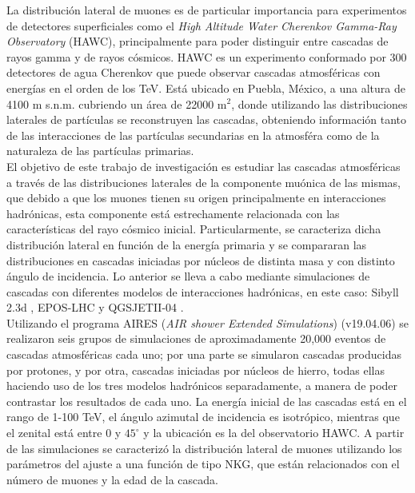 La distribuci\'on lateral de muones es de particular importancia para experimentos de detectores superficiales como el \textit{High Altitude Water Cherenkov Gamma-Ray Observatory} (HAWC), principalmente para poder distinguir entre cascadas de rayos gamma y de rayos c\'osmicos. HAWC es un experimento conformado por 300 detectores de agua Cherenkov que puede observar cascadas atmosf\'ericas con energ\'ias en el orden de los TeV. Est\'a ubicado en Puebla, M\'exico, a una altura de 4100 m s.n.m. cubriendo un \'area de 22000 m$^2$, donde utilizando las distribuciones laterales de part\'iculas se reconstruyen las cascadas, obteniendo informaci\'on tanto de las interacciones de las part\'iculas secundarias en la atmosf\'era como de la naturaleza de las part\'iculas primarias.\\

El objetivo de este trabajo de investigaci\'on es estudiar las cascadas atmosf\'ericas a trav\'es de las distribuciones laterales de la componente mu\'onica de las mismas, que debido a que los muones tienen su origen principalmente en interacciones hadr\'onicas, esta componente est\'a estrechamente relacionada con las caracter\'isticas del rayo c\'osmico inicial. Particularmente, se caracteriza dicha distribuci\'on lateral en funci\'on de la energ\'ia primaria y se compararan las distribuciones en cascadas iniciadas por n\'ucleos de distinta masa y con distinto \'angulo de incidencia. Lo anterior se lleva a cabo mediante simulaciones de cascadas con diferentes modelos de interacciones hadrónicas, en este caso: Sibyll 2.3d \cite{Riehn2020}, EPOS-LHC \cite{Pierog2015} y QGSJETII-04 \cite{Ostapchenko2011}.\\

Utilizando el programa AIRES (\textit{AIR shower Extended Simulations}) (v19.04.06) \cite{Sciutto2021} se realizaron seis grupos de simulaciones de aproximadamente 20,000 eventos de cascadas atmosf\'ericas cada uno; por una parte se simularon cascadas producidas por protones, y por otra, cascadas iniciadas por n\'ucleos de hierro, todas ellas haciendo uso de los tres modelos hadr\'onicos separadamente, a manera de poder contrastar los resultados de cada uno. La energ\'ia inicial de las cascadas est\'a en el rango de 1-100 TeV, el \'angulo azimutal de incidencia es isotr\'opico, mientras que el zenital est\'a entre 0 y $45^{\circ}$ y la ubicaci\'on es la del observatorio HAWC. A partir de las simulaciones se caracteriz\'o la distribuci\'on lateral de muones utilizando los par\'ametros del ajuste a una funci\'on de tipo NKG, que est\'an relacionados con el n\'umero de muones y la edad de la cascada.\\

